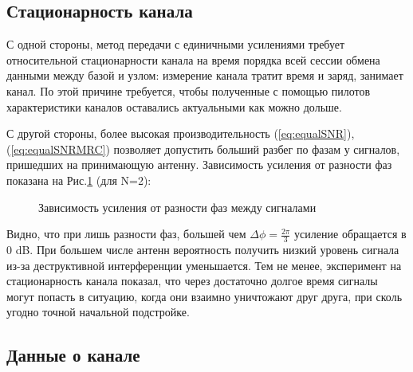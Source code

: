 \documentclass[a4paper,12pt,oneside]{scrartcl}
\begin{document}
\subsection{Стационарность канала}
С одной стороны, метод передачи с единичными усилениями требует относительной стационарности канала на время порядка всей сессии обмена данными между базой и узлом: измерение канала тратит время и заряд, занимает канал. 
По этой причине требуется, чтобы полученные с помощью пилотов характеристики каналов оставались актуальными как можно дольше.

С другой стороны, более высокая производительность (\ref{eq:equalSNR}), (\ref{eq:equalSNRMRC}) позволяет допустить больший разбег по фазам у сигналов, пришедших на принимающую антенну. 
Зависимость усиления от разности фаз показана на Рис.\ref{fig:PDtheory} (для N=2):
\begin{figure}[!htb]
\caption{Зависимость усиления от разности фаз между сигналами}
\label{fig:PDtheory}
\end{figure}

Видно, что при лишь разности фаз, большей чем $\Delta\phi=\frac{2\pi}{3}$ усиление обращается в 0 dB. 
При большем числе антенн вероятность получить низкий уровень сигнала из-за деструктивной интерференции уменьшается. 
Тем не менее, эксперимент на стационарность канала показал, что через достаточно долгое время сигналы могут попасть в ситуацию, когда они взаимно уничтожают друг друга, при сколь угодно точной начальной подстройке.

\subsection{Данные о канале}
\end{document}
